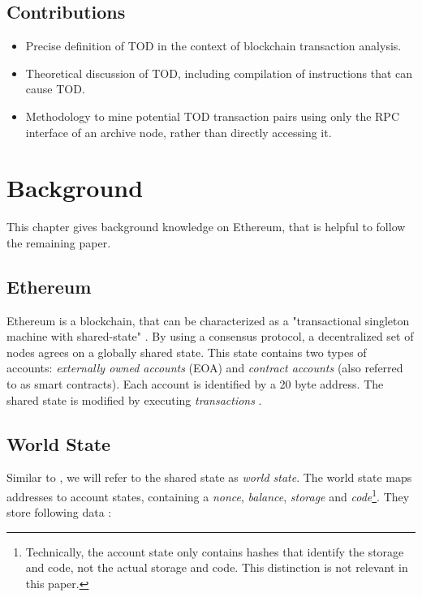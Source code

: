 \documentclass[draft,final]{vutinfth} %
\begin{document}
\section{Contributions}

\begin{itemize}
    \item Precise definition of TOD in the context of blockchain transaction analysis.
    \item Theoretical discussion of TOD, including compilation of instructions that can cause TOD.
    \item Methodology to mine potential TOD transaction pairs using only the RPC interface of an archive node, rather than directly accessing it.
\end{itemize}

\chapter{Background}

This chapter gives background knowledge on Ethereum, that is helpful to follow the remaining paper.

\section{Ethereum}

Ethereum is a blockchain, that can be characterized as a "transactional singleton machine with shared-state" \cite{wood_ethereum_2024}. By using a consensus protocol, a decentralized set of nodes agrees on a globally shared state. This state contains two types of accounts: \emph{externally owned accounts} (EOA) and \emph{contract accounts} (also referred to as smart contracts). Each account is identified by a 20 byte address. The shared state is modified by executing \emph{transactions} \cite{tikhomirov_ethereum_2018}.

\section{World State}

Similar to \cite{wood_ethereum_2024}, we will refer to the shared state as \emph{world state}. The world state maps addresses to account states, containing a \emph{nonce}, \emph{balance}, \emph{storage} and \emph{code}\footnote{Technically, the account state only contains hashes that identify the storage and code, not the actual storage and code. This distinction is not relevant in this paper.}. They store following data \cite{wood_ethereum_2024}:
\end{document}
